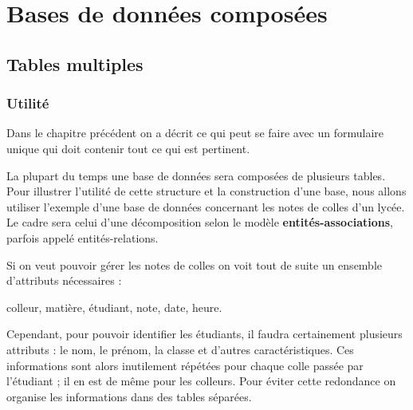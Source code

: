 \chapter{Bases de données composées}
\thispagestyle{empty}
\section{Tables multiples}
\subsection{Utilité}
Dans le chapitre précédent on a décrit ce qui peut se faire avec un formulaire unique qui doit contenir tout ce qui est pertinent. 

La plupart du temps une base de données sera composées de plusieurs tables. Pour illustrer l'utilité de cette structure et la construction d'une base, nous allons utiliser l'exemple d'une base de données concernant les notes de colles d'un lycée. Le cadre sera celui d'une décomposition selon le modèle {\bf entités-associations}, parfois appelé entités-relations.


\medskip

Si on veut pouvoir gérer les notes de colles on voit tout de suite un ensemble d'attributs nécessaires :

colleur, matière, étudiant, note, date, heure.

Cependant, pour pouvoir identifier les étudiants, il faudra certainement plusieurs attributs : le nom, le prénom, la classe et d'autres caractéristiques. Ces informations sont alors inutilement répétées pour chaque colle passée par l'étudiant ; il en est de même pour les colleurs.  Pour éviter cette redondance on organise les informations dans des tables séparées.
